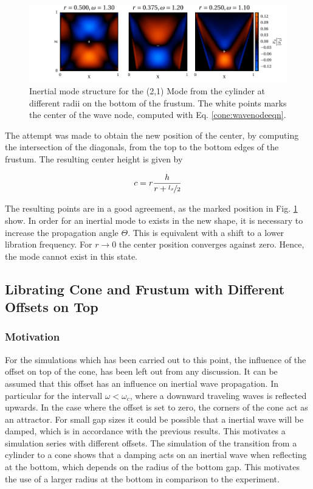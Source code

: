 \clearpage
\begin{figure}[!t]
  \centering
  \includegraphics{gfx/cone/transition/phase.pdf}
  \caption{\label{fig:cone:phase}
    Inertial mode structure for the (2,1) Mode from the cylinder at different radii on the bottom of the frustum.
    The white points marks the center of the wave node, computed with Eq.  \ref{cone:wavenodeeqn}.
  }
\end{figure}

The attempt was made to obtain the new position of the center,
by computing the intersection of the diagonals, from the top to the bottom edges of the frustum.
The resulting center height is given by

\begin{align}
\label{cone:wavenodeeqn}
c  = r \frac{h}{r+\nicefrac{l_x}{2}}
\end{align}

The resulting points are in a good agreement, as the marked position in Fig. \ref{fig:cone:phase} show.
In order for an inertial mode to exists in the new shape, it is necessary to increase the propagation angle $\Theta$.
This is equivalent with a shift to a lower libration frequency.
For $r \rightarrow 0$ the center position converges against zero. Hence, the mode cannot exist in this state.

\clearpage

\subsection{Librating Cone and Frustum with Different Offsets on Top}

\subsubsection{Motivation}

For the simulations which has been carried out to this point,
the influence of the offset on top of the cone, has been left out from any discussion.
It can be assumed that this offset has an influence on inertial wave propagation.
In particular for the intervall $\omega<\omega_c$, where a downward traveling waves is
reflected upwards.
In the case where the offset is set to zero, the corners of the cone act as an attractor.
For small gap sizes it could be possible that a inertial wave will be damped,
which is in accordance with the previous results.
This motivates a simulation series with different offsets.
The simulation of the transition from a cylinder to a cone shows
that a damping acts on an inertial wave when reflecting at the bottom,
which  depends on the radius of the bottom gap.
This motivates the use of a larger radius at the bottom in comparison to the experiment.

